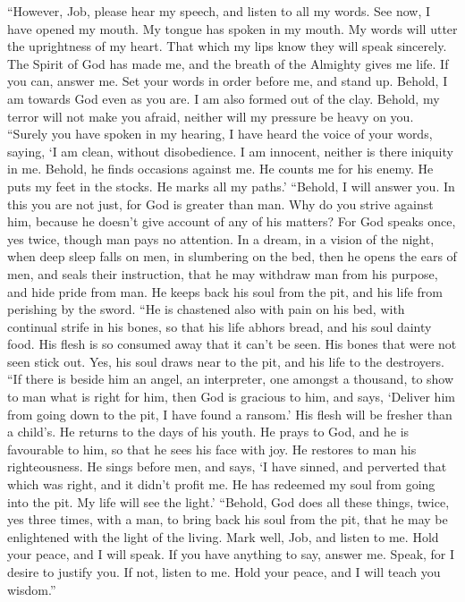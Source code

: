 ``However, Job, please hear my speech, and listen to all
my words.  See now, I have opened my mouth. My tongue has
spoken in my mouth.  My words will utter the uprightness
of my heart. That which my lips know they will speak sincerely.
 The Spirit of God has made me, and the breath of the
Almighty gives me life.  If you can, answer me. Set your
words in order before me, and stand up.  Behold, I am
towards God even as you are. I am also formed out of the clay.
 Behold, my terror will not make you afraid, neither will
my pressure be heavy on you.  ``Surely you have spoken in
my hearing, I have heard the voice of your words, saying, 
`I am clean, without disobedience. I am innocent, neither is there
iniquity in me.  Behold, he finds occasions against me.
He counts me for his enemy.  He puts my feet in the
stocks. He marks all my paths.'  ``Behold, I will answer
you. In this you are not just, for God is greater than man.
 Why do you strive against him, because he doesn't give
account of any of his matters?  For God speaks once, yes
twice, though man pays no attention.  In a dream, in a
vision of the night, when deep sleep falls on men, in slumbering on the
bed,  then he opens the ears of men, and seals their
instruction,  that he may withdraw man from his purpose,
and hide pride from man.  He keeps back his soul from the
pit, and his life from perishing by the sword.  ``He is
chastened also with pain on his bed, with continual strife in his bones,
 so that his life abhors bread, and his soul dainty food.
 His flesh is so consumed away that it can't be seen. His
bones that were not seen stick out.  Yes, his soul draws
near to the pit, and his life to the destroyers.  ``If
there is beside him an angel, an interpreter, one amongst a thousand, to
show to man what is right for him,  then God is gracious
to him, and says, `Deliver him from going down to the pit, I have found
a ransom.'  His flesh will be fresher than a child's. He
returns to the days of his youth.  He prays to God, and
he is favourable to him, so that he sees his face with joy. He restores
to man his righteousness.  He sings before men, and says,
`I have sinned, and perverted that which was right, and it didn't profit
me.  He has redeemed my soul from going into the pit. My
life will see the light.'  ``Behold, God does all these
things, twice, yes three times, with a man,  to bring
back his soul from the pit, that he may be enlightened with the light of
the living.  Mark well, Job, and listen to me. Hold your
peace, and I will speak.  If you have anything to say,
answer me. Speak, for I desire to justify you.  If not,
listen to me. Hold your peace, and I will teach you wisdom.''

